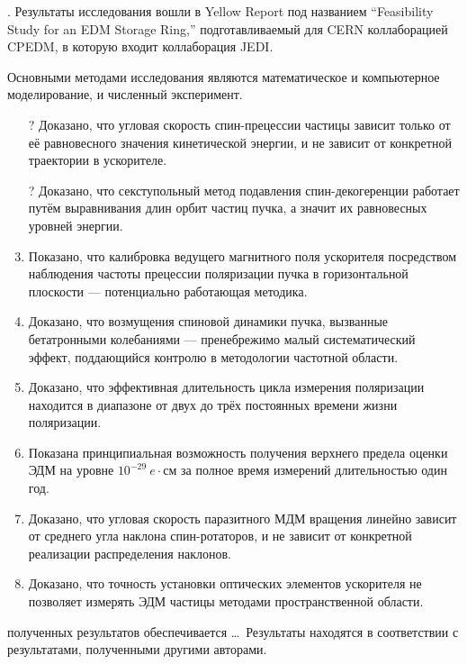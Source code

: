 {\influence}. Результаты исследования вошли в Yellow Report под названием ``Feasibility Study for an EDM Storage Ring,'' подготавливаемый для CERN коллаборацией CPEDM, в которую входит коллаборация JEDI.

{\methods} Основными методами исследования являются математическое и компьютерное моделирование, и численный эксперимент.

{}
\begin{enumerate}
  \item[?] Доказано, что угловая скорость спин-прецессии частицы зависит только от её равновесного значения кинетической энергии, и не зависит от конкретной траектории в ускорителе. %
  \item[?] Доказано, что секступольный метод подавления спин-декогеренции работает путём выравнивания длин орбит частиц пучка, а значит их равновесных уровней энергии. %
  \item Показано, что калибровка ведущего магнитного поля ускорителя посредством наблюдения частоты прецессии поляризации пучка в горизонтальной плоскости --- потенциально работающая методика.
  \item Доказано, что возмущения спиновой динамики пучка, вызванные бетатронными колебаниями --- пренебрежимо малый систематический эффект, поддающийся контролю в методологии частотной области. %
  \item Доказано, что эффективная длительность цикла измерения поляризации находится в диапазоне от двух до трёх постоянных времени жизни поляризации. %
  \item Показана принципиальная возможность получения верхнего предела оценки ЭДМ на уровне $10^{-29}~e\cdot$см за полное время измерений длительностью один год. %
  \item Доказано, что угловая скорость паразитного МДМ вращения линейно зависит от среднего угла наклона спин-ротаторов, и не зависит от конкретной реализации распределения наклонов. %
  \item Доказано, что точность установки оптических элементов ускорителя не позволяет измерять ЭДМ частицы методами пространственной области. %
\end{enumerate}

{\reliability} полученных результатов обеспечивается \ldots \ Результаты находятся в соответствии с результатами, полученными другими авторами.


